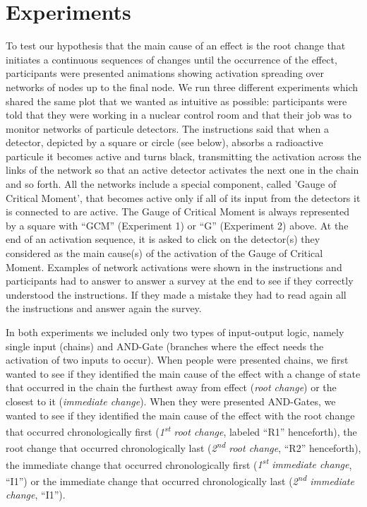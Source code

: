 \documentclass[10pt,letterpaper]{article}
\begin{document}
\section{Experiments}

To test our hypothesis that the main cause of an effect is the root change that initiates a continuous sequences of changes until the occurrence of the effect, participants were presented animations showing activation spreading over networks of nodes up to the final node. We run three different experiments which shared the same plot that we wanted as intuitive as possible: participants were told that they were working in a nuclear control room and that their job was to monitor networks of particule detectors. The instructions said that when a detector, depicted by a square or circle (see below), absorbs a radioactive particule it becomes active and turns black, transmitting the activation across the links of the network so that an active detector activates the next one in the chain and so forth. All the networks include a special component, called 'Gauge of Critical Moment', that becomes active only if all of its input from the detectors it is connected to are active. The Gauge of Critical Moment is always represented by a square with ``GCM'' (Experiment 1) or ``G'' (Experiment 2) above. At the end of an activation sequence, it is asked to click on the detector(s) they considered as the main cause(s) of the activation of the Gauge of Critical Moment. Examples of network activations were shown in the instructions and participants had to answer to answer a survey at the end to see if they correctly understood the instructions. If they made a mistake they had to read again all the instructions and answer again the survey. 

In both experiments we included only two types of input-output logic, namely single input (chains) and AND-Gate (branches where the effect needs the activation of two inputs to occur). When people were presented chains, we first wanted to see if they identified the main cause of the effect with a change of state that occurred in the chain the furthest away from effect (\textit{root change}) or the closest to it (\textit{immediate change}). When they were presented AND-Gates, we wanted to see if they identified the main cause of the effect with the root change that occurred chronologically first (\textit{1\textsuperscript{st} root change}, labeled ``R1'' henceforth), the root change that occurred chronologically last (\textit{2\textsuperscript{nd} root change}, ``R2'' henceforth), the immediate change that occurred chronologically first (\textit{1\textsuperscript{st} immediate change}, ``I1'') or the immediate change that occurred chronologically last (\textit{2\textsuperscript{nd} immediate change}, ``I1'').
\end{document}
